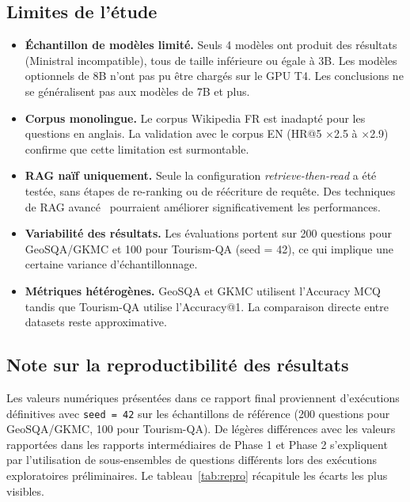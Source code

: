 \documentclass[12pt,a4paper]{article}
\begin{document}
\subsection{Limites de l'\'etude}

\begin{itemize}[leftmargin=*]
  \item \textbf{\'Echantillon de mod\`eles limit\'e.} Seuls 4 mod\`eles ont produit des r\'esultats (Ministral incompatible), tous de taille inf\'erieure ou \'egale \`a 3B. Les mod\`eles optionnels de 8B n'ont pas pu \^etre charg\'es sur le GPU T4. Les conclusions ne se g\'en\'eralisent pas aux mod\`eles de 7B et plus.

  \item \textbf{Corpus monolingue.} Le corpus Wikipedia FR est inadapt\'e pour les questions en anglais. La validation avec le corpus EN (HR@5 $\times$2.5 \`a $\times$2.9) confirme que cette limitation est surmontable.

  \item \textbf{RAG na\"if uniquement.} Seule la configuration \textit{retrieve-then-read} a \'et\'e test\'ee, sans \'etapes de re-ranking ou de r\'e\'ecriture de requ\^ete. Des techniques de RAG avanc\'e~\cite{gao2023ragsurvey} pourraient am\'eliorer significativement les performances.

  \item \textbf{Variabilit\'e des r\'esultats.} Les \'evaluations portent sur 200 questions pour GeoSQA/GKMC et 100 pour Tourism-QA (seed = 42), ce qui implique une certaine variance d'\'echantillonnage.

  \item \textbf{M\'etriques h\'et\'erog\`enes.} GeoSQA et GKMC utilisent l'Accuracy MCQ tandis que Tourism-QA utilise l'Accuracy@1. La comparaison directe entre datasets reste approximative.
\end{itemize}

\subsection{Note sur la reproductibilité des résultats}

Les valeurs numériques présentées dans ce rapport final proviennent 
d'exécutions définitives avec \texttt{seed = 42} sur les échantillons de 
référence (200 questions pour GeoSQA/GKMC, 100 pour Tourism-QA). De légères 
différences avec les valeurs rapportées dans les rapports intermédiaires de 
Phase 1 et Phase 2 s'expliquent par l'utilisation de sous-ensembles de questions 
différents lors des exécutions exploratoires préliminaires. Le tableau~\ref{tab:repro} 
récapitule les écarts les plus visibles.
\end{document}
